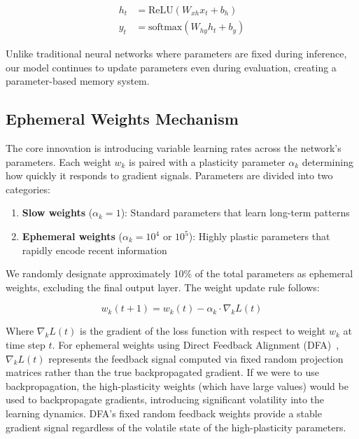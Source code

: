 \begin{align}
h_t &= \text{ReLU}(W_{xh}x_t + b_h)\\
y_t &= \text{softmax}(W_{hy}h_t + b_y)
\end{align}

Unlike traditional neural networks where parameters are fixed during inference, our model continues to update parameters even during evaluation, creating a parameter-based memory system.

\subsection{Ephemeral Weights Mechanism}

The core innovation is introducing variable learning rates across the network's parameters. Each weight $w_k$ is paired with a plasticity parameter $\alpha_k$ determining how quickly it responds to gradient signals. Parameters are divided into two categories:

\begin{enumerate}
\item \textbf{Slow weights} ($\alpha_k = 1$): Standard parameters that learn long-term patterns
\item \textbf{Ephemeral weights} ($\alpha_k = 10^4$ or $10^5$): Highly plastic parameters that rapidly encode recent information
\end{enumerate}

We randomly designate approximately 10\% of the total parameters as ephemeral weights, excluding the final output layer. The weight update rule follows:

\begin{equation}
w_k(t+1) = w_k(t) - \alpha_k \cdot \nabla_k L(t)
\end{equation}

Where $\nabla_k L(t)$ is the gradient of the loss function with respect to weight $w_k$ at time step $t$. For ephemeral weights using Direct Feedback Alignment (DFA)~\cite{noklandDirectFeedbackAlignment}, $\nabla_k L(t)$ represents the feedback signal computed via fixed random projection matrices rather than the true backpropagated gradient. If we were to use backpropagation, the high-plasticity weights (which have large values) would be used to backpropagate gradients, introducing significant volatility into the learning dynamics. DFA's fixed random feedback weights provide a stable gradient signal regardless of the volatile state of the high-plasticity parameters.

